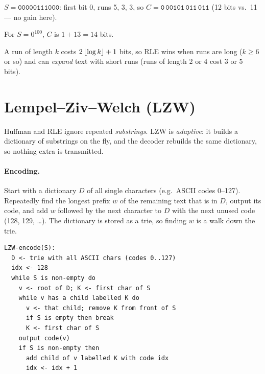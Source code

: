 \begin{example}
$S = \texttt{00000111000}$: first bit 0, runs 5, 3, 3, so
$C = \texttt{0}\,\texttt{00101}\,\texttt{011}\,\texttt{011}$ (12 bits vs.\ 11 ---
no gain here).
\begin{center}
\end{center} For $S = 0^{100}$, $C$ is $1 + 13 = 14$ bits.
\end{example}

A run of length $k$ costs $2\left\lfloor \log k \right\rfloor + 1$ bits, so RLE wins when runs are
long ($k \ge 6$ or so) and can \emph{expand} text with short runs (runs of length
2 or 4 cost 3 or 5 bits).

\section{Lempel--Ziv--Welch (LZW)}

Huffman and RLE ignore repeated \emph{substrings}. LZW is \emph{adaptive}: it
builds a dictionary of substrings on the fly, and the decoder rebuilds the same
dictionary, so nothing extra is transmitted.

\paragraph{Encoding.} Start with a dictionary $D$ of all single characters
(e.g.\ ASCII codes 0--127). Repeatedly find the longest prefix $w$ of the
remaining text that is in $D$, output its code, and add $w$ followed by the next
character to $D$ with the next unused code (128, 129, \ldots). The dictionary is
stored as a trie, so finding $w$ is a walk down the trie.

\begin{lstlisting}
LZW-encode(S):
  D <- trie with all ASCII chars (codes 0..127)
  idx <- 128
  while S is non-empty do
    v <- root of D; K <- first char of S
    while v has a child labelled K do
      v <- that child; remove K from front of S
      if S is empty then break
      K <- first char of S
    output code(v)
    if S is non-empty then
      add child of v labelled K with code idx
      idx <- idx + 1
\end{lstlisting}

